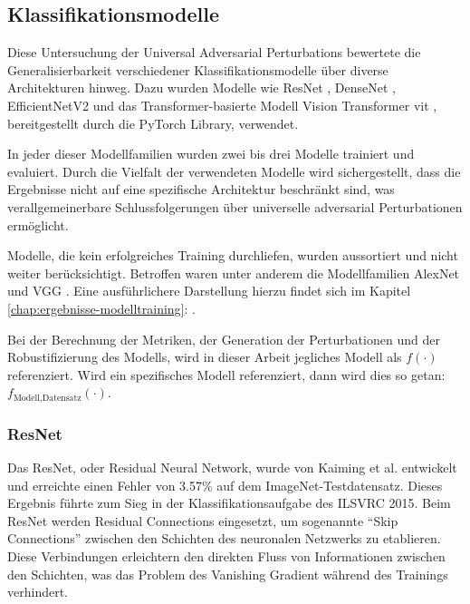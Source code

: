 \subsection{Klassifikationsmodelle} \label{chap:klassifikationsmodelle}
Diese Untersuchung der Universal Adversarial Perturbations bewertete die Generalisierbarkeit verschiedener Klassifikationsmodelle über diverse Architekturen hinweg. Dazu wurden Modelle wie ResNet \cite{he_deep_2015}, DenseNet \cite{huang_densely_2018}, EfficientNetV2 \cite{tan_efficientnetv2_2021} und das Transformer-basierte Modell Vision Transformer \acrshort{vit} \cite{dosovitskiy_image_2021}, bereitgestellt durch die PyTorch Library, verwendet.

In jeder dieser Modellfamilien wurden zwei bis drei Modelle trainiert und evaluiert. Durch die Vielfalt der verwendeten Modelle wird sichergestellt, dass die Ergebnisse nicht auf eine spezifische Architektur beschränkt sind, was verallgemeinerbare Schlussfolgerungen über universelle adversarial Perturbationen ermöglicht.

Modelle, die kein erfolgreiches Training durchliefen, wurden aussortiert und nicht weiter berücksichtigt. Betroffen waren unter anderem die Modellfamilien AlexNet \cite{krizhevsky_imagenet_2012} und VGG \cite{simonyan_very_2015}. Eine ausführlichere Darstellung hierzu findet sich im Kapitel \ref{chap:ergebnisse-modelltraining}: .

Bei der Berechnung der Metriken, der Generation der Perturbationen und der Robustifizierung des Modells, wird in dieser Arbeit jegliches Modell als $f(\cdot)$ referenziert. Wird ein spezifisches Modell referenziert, dann wird dies so getan: $f_{\text{Modell,Datensatz}}(\cdot)$.

\subsubsection{ResNet}
Das ResNet, oder Residual Neural Network, wurde von Kaiming et al. \cite{he_deep_2015} entwickelt und erreichte einen Fehler von 3.57\% auf dem ImageNet-Testdatensatz. Dieses Ergebnis führte zum Sieg in der Klassifikationsaufgabe des ILSVRC 2015. Beim ResNet werden Residual Connections eingesetzt, um sogenannte "`Skip Connections"' zwischen den Schichten des neuronalen Netzwerks zu etablieren. Diese Verbindungen erleichtern den direkten Fluss von Informationen zwischen den Schichten, was das Problem des Vanishing Gradient während des Trainings verhindert.


